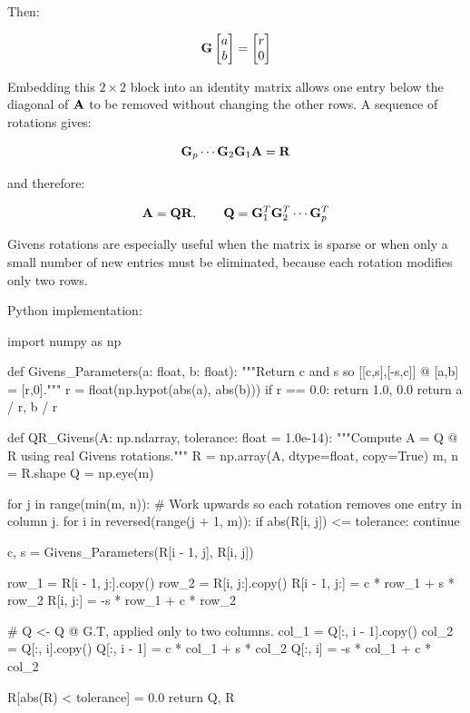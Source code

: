 Then:

\begin{equation}
    \mathbf{G}
    \begin{bmatrix}
        a \\
        b
    \end{bmatrix}
    =
    \begin{bmatrix}
        r \\
        0
    \end{bmatrix}
\end{equation}

Embedding this $ 2\times2 $ block into an identity matrix allows one entry below
the diagonal of $ \mathbf{A} $ to be removed without changing the other rows. A
sequence of rotations gives:

\begin{equation}
    \mathbf{G}_p\cdots\mathbf{G}_2\mathbf{G}_1\mathbf{A}=\mathbf{R}
\end{equation}

and therefore:

\begin{equation}
    \mathbf{A}=\mathbf{Q}\mathbf{R},\qquad
    \mathbf{Q}=\mathbf{G}_1^{T}\mathbf{G}_2^{T}\cdots\mathbf{G}_p^{T}
\end{equation}

Givens rotations are especially useful when the matrix is sparse or when only a
small number of new entries must be eliminated, because each rotation modifies
only two rows.

Python implementation:

\begin{python}
import numpy as np


def Givens_Parameters(a: float, b: float):
    """Return c and s so [[c,s],[-s,c]] @ [a,b] = [r,0]."""
    r = float(np.hypot(abs(a), abs(b)))
    if r == 0.0:
        return 1.0, 0.0
    return a / r, b / r


def QR_Givens(A: np.ndarray,
              tolerance: float = 1.0e-14):
    """Compute A = Q @ R using real Givens rotations."""
    R = np.array(A, dtype=float, copy=True)
    m, n = R.shape
    Q = np.eye(m)

    for j in range(min(m, n)):
        # Work upwards so each rotation removes one entry in column j.
        for i in reversed(range(j + 1, m)):
            if abs(R[i, j]) <= tolerance:
                continue

            c, s = Givens_Parameters(R[i - 1, j], R[i, j])

            row_1 = R[i - 1, j:].copy()
            row_2 = R[i, j:].copy()
            R[i - 1, j:] = c * row_1 + s * row_2
            R[i, j:] = -s * row_1 + c * row_2

            # Q <- Q @ G.T, applied only to two columns.
            col_1 = Q[:, i - 1].copy()
            col_2 = Q[:, i].copy()
            Q[:, i - 1] = c * col_1 + s * col_2
            Q[:, i] = -s * col_1 + c * col_2

    R[abs(R) < tolerance] = 0.0
    return Q, R
\end{python}

